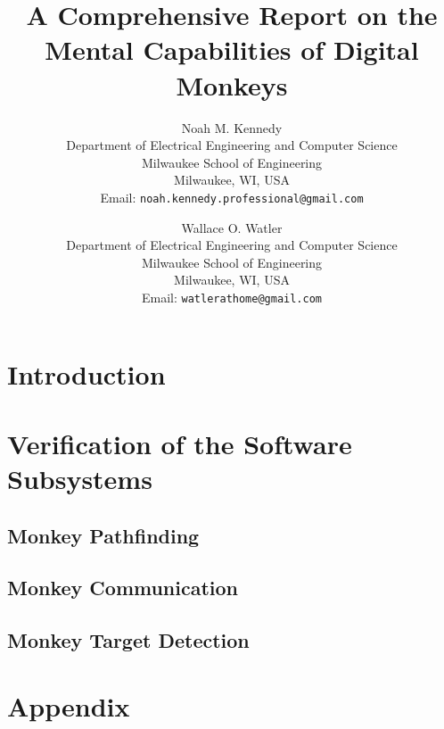 \documentclass[11pt]{article}
\title{
    A Comprehensive Report on the Mental Capabilities of Digital Monkeys
}
\author{
    Noah M. Kennedy \\[3pt]
    {\small Department of Electrical Engineering and Computer Science} \\
    {\small Milwaukee School of Engineering} \\
    {\small Milwaukee, WI, USA} \\
    {\small Email: {\tt noah.kennedy.professional@gmail.com}} \\[12pt]
\and
    Wallace O. Watler \\[3pt]
    {\small Department of Electrical Engineering and Computer Science} \\
    {\small Milwaukee School of Engineering} \\
    {\small Milwaukee, WI, USA} \\
    {\small Email: {\tt watlerathome@gmail.com}} \\[12pt]
}
\date{}
\begin{document}
    \maketitle

    \abstract
    

    \newpage

    \tableofcontents

    \newpage

    \section{Introduction}\label{sec:introduction}
    

    \section{Verification of the Software Subsystems}\label{sec:software-subsystems-results}

    \subsection{Monkey Pathfinding}\label{subsec:monkey-pathfinding}
    

    \subsection{Monkey Communication}\label{subsec:monkey-communication}
    

    \subsection{Monkey Target Detection}\label{subsec:monkey-target-detection}
    

    \section*{Appendix}\label{sec:appendix}

    \pagebreak

    \printbibliography
\end{document}
